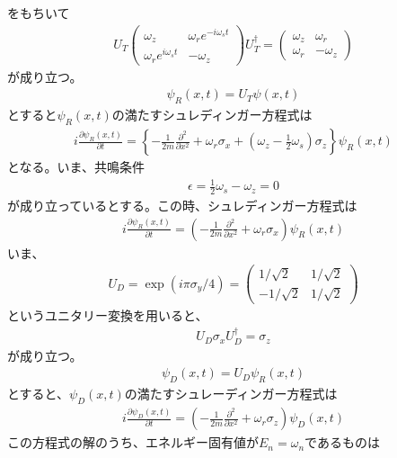 をもちいて
\begin{align}
U_{T}\begin{pmatrix}
\omega_{z} &\omega_{r}e^{-i\omega_{s}t} \\
\omega_{r}e^{i\omega_{s}t} &-\omega_{z}
\end{pmatrix}U_{T}^{\dagger}=
\begin{pmatrix}
\omega_{z} &\omega_{r} \\
\omega_{r} &-\omega_{z}
\end{pmatrix}
\end{align}
が成り立つ。
\begin{align}
{\psi}_{R}(x,t)=U_{T}{\psi}(x,t)
\end{align}
とすると${\psi}_{R}(x,t)$の満たすシュレディンガー方程式は
\begin{align}
i\frac{\partial {\psi}_{R}(x,t)}{\partial t}=\left\{-\frac{1}{2m}\frac{\partial^2}{\partial x^2}+\omega_{r}{\sigma}_{x}+\left(\omega_{z}-\frac{1}{2}\omega_{s}\right){\sigma}_{z}\right\}{\psi}_{R}(x,t)
\end{align}
となる。いま、共鳴条件
\begin{align}
{\epsilon}=\frac{1}{2}\omega_{s}-\omega_{z}=0\label{pi2flipper_resonance}
\end{align}
が成り立っているとする。この時、シュレディンガー方程式は
\begin{align}
i\frac{\partial {\psi}_{R}(x,t)}{\partial t}=\left(-\frac{1}{2m}\frac{\partial^2}{\partial x^2}+\omega_{r}{\sigma}_{x}\right){\psi}_{R}(x,t)
\end{align}
いま、
\begin{align}
U_{D}=\exp(i{\pi}{\sigma}_{y}/4)=
\begin{pmatrix}
1/\sqrt{2} &1/\sqrt{2} \\
-1/\sqrt{2} &1/\sqrt{2}
\end{pmatrix}
\end{align}
というユニタリー変換を用いると、
\begin{align}
U_{D}{\sigma}_{x}U_{D}^{\dagger}={\sigma}_{z}
\end{align}
が成り立つ。
\begin{align}
{\psi}_{D}(x,t)=U_{D}{\psi}_{R}(x,t)
\end{align}
とすると、${\psi}_{D}(x,t)$の満たすシュレーディンガー方程式は
\begin{align}
i\frac{\partial {\psi}_{D}(x,t)}{\partial t}=\left(-\frac{1}{2m}\frac{\partial^2}{\partial x^2}+\omega_{r}{\sigma}_{z}\right){\psi}_{D}(x,t)
\end{align}
この方程式の解のうち、エネルギー固有値が$E_{n}=\omega_{n}$であるものは
